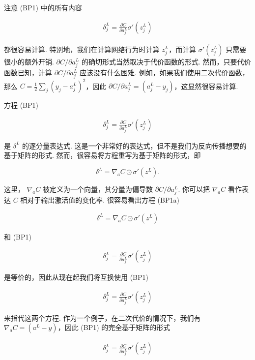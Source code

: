 注意 (BP1) 中的所有内容

\begin{align*}
\delta^L_j = \frac{\partial C}{\partial a^L_j} \sigma'(z^L_j) \nonumber
\end{align*}

\noindent 都很容易计算. 特别地，我们在计算网络行为时计算 $z^L_j$，而计算 $\sigma'(z^L_j)$ 只需要很小的额外开销. $\partial C / \partial a^L_j$ 的确切形式当然取决于代价函数的形式. 然而，只要代价函数已知，计算 $\partial C / \partial a^L_j$ 应该没有什么困难. 例如，如果我们使用二次代价函数，那么 $C = \frac{1}{2} \sum_j (y_j-a^L_j)^2$，因此 $\partial C / \partial a^L_j = (a_j^L-y_j)$，这显然很容易计算.

方程 (BP1)

\begin{align*}
\delta^L_j = \frac{\partial C}{\partial a^L_j} \sigma'(z^L_j) \nonumber
\end{align*}

\noindent 是 $\delta^L$ 的逐分量表达式. 这是一个非常好的表达式，但不是我们为反向传播想要的基于矩阵的形式. 然而，很容易将方程重写为基于矩阵的形式，即

\begin{equation}
\delta^L = \nabla_a C \odot \sigma'(z^L).
\tag{BP1a}
\end{equation}

\noindent 这里， $\nabla_a C$ 被定义为一个向量，其分量为偏导数 $\partial C / \partial a^L_j$. 你可以把 $\nabla_a C$ 看作表达 $C$ 相对于输出激活值的变化率. 很容易看出方程 (BP1a)

\begin{align*}
\delta^L = \nabla_a C \odot \sigma'(z^L) \nonumber
\end{align*}

\noindent 和 (BP1)

\begin{align*}
\delta^L_j = \frac{\partial C}{\partial a^L_j} \sigma'(z^L_j) \nonumber
\end{align*}

\noindent 是等价的，因此从现在起我们将互换使用 (BP1)

\begin{align*}
\delta^L_j = \frac{\partial C}{\partial a^L_j} \sigma'(z^L_j) \nonumber
\end{align*}

\noindent 来指代这两个方程. 作为一个例子，在二次代价的情况下，我们有 $\nabla_a C = (a^L-y)$，因此 (BP1) 的完全基于矩阵的形式

\begin{align*}
\delta^L_j = \frac{\partial C}{\partial a^L_j} \sigma'(z^L_j) \nonumber
\end{align*}

